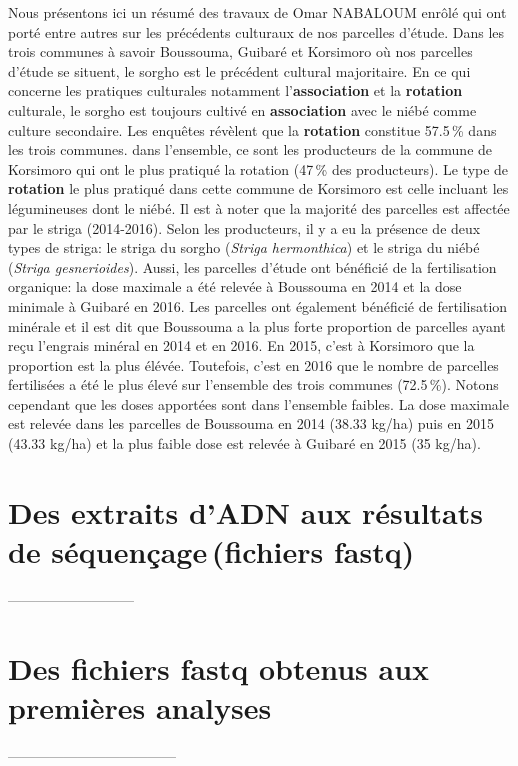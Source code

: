 \documentclass[a4paper,11pt]{article}
\begin{document}
Nous présentons ici un résumé des travaux de Omar NABALOUM enrôlé qui
ont porté entre autres sur les précédents culturaux de nos parcelles
d'étude.  Dans les trois communes à savoir Boussouma, Guibaré et
Korsimoro où nos parcelles d'étude se situent, le sorgho est le
précédent cultural majoritaire.  En ce qui concerne les pratiques
culturales notamment l'\textbf{association} et la \textbf{rotation}
culturale, le sorgho est toujours cultivé en \textbf{association} avec
le niébé comme culture secondaire.  Les enquêtes révèlent que la
\textbf{rotation} constitue 57.5\,\% dans les trois communes. dans
l'ensemble, ce sont les producteurs de la commune de Korsimoro qui ont
le plus pratiqué la rotation (47\,\% des producteurs). Le type de
\textbf{rotation} le plus pratiqué dans cette commune de Korsimoro est
celle incluant les légumineuses dont le niébé.  Il est à noter que la
majorité des parcelles est affectée par le striga (2014-2016). Selon
les producteurs, il y a eu la présence de deux types de striga: le
striga du sorgho (\emph{Striga hermonthica}) et le striga du niébé
(\emph{Striga gesnerioides}). Aussi, les parcelles d'étude ont
bénéficié de la fertilisation organique: la dose maximale a été
relevée à Boussouma en 2014 et la dose minimale à Guibaré en 2016. Les
parcelles ont également bénéficié de fertilisation minérale et il est
dit que Boussouma a la plus forte proportion de parcelles ayant reçu
l'engrais minéral en 2014 et en 2016. En 2015, c'est à Korsimoro que
la proportion est la plus élévée. Toutefois, c'est en 2016 que le
nombre de parcelles fertilisées a été le plus élevé sur l'ensemble des
trois communes (72.5\,\%).  Notons cependant que les doses apportées
sont dans l'ensemble faibles. La dose maximale est relevée dans les
parcelles de Boussouma en 2014 (38.33 kg/ha) puis en 2015 (43.33
kg/ha) et la plus faible dose est relevée à Guibaré en 2015 (35
kg/ha).

\section{Des extraits d'ADN aux résultats de séquençage\,(fichiers fastq)}
 ---------------------------
\section{Des fichiers fastq obtenus aux premières analyses}
------------------------------------
 
\end{document}
